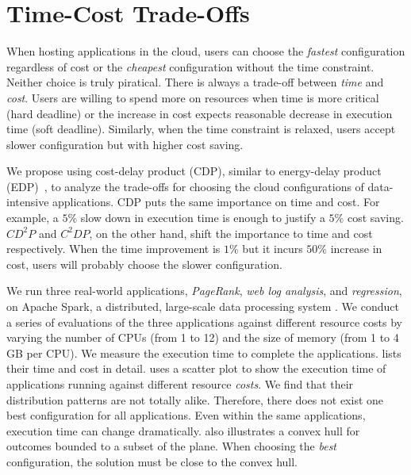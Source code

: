 \section{Time-Cost Trade-Offs}
\label{sec:cdp}



When hosting applications in the cloud,
users can choose the \emph{fastest} configuration regardless of cost
or the \emph{cheapest} configuration without the time constraint.
Neither choice is truly piratical.
There is always a trade-off between \emph{time} and \emph{cost}.
Users are willing to spend more on resources when
time is more critical (hard deadline) or
the increase in cost expects reasonable decrease in execution time (soft deadline).
Similarly, when the time constraint is relaxed, users accept
slower configuration but with higher cost saving.

We propose using cost-delay product (CDP),
similar to energy-delay product (EDP)~\cite{Freeh2007},
to analyze the trade-offs
for choosing the cloud configurations of data-intensive applications.
CDP puts the same importance on time and cost.
For example,
a $5\%$ slow down in execution time
is enough to justify
a $5\%$ cost saving.
$CD^2P$ and $C^2DP$, on the other hand, shift the importance to
time and cost respectively.
When the time improvement is $1\%$ but it incurs $50\%$ increase in cost,
users will probably choose the slower configuration.


We run three real-world applications,
\emph{PageRank},
\emph{web log analysis}, and
\emph{regression},
on Apache Spark, a distributed, large-scale data processing system \cite{spark}.
We conduct a series of evaluations of the three applications against
different resource costs by varying
the number of CPUs (from 1 to 12)
and
the size of memory (from 1 to 4 GB per CPU).
We measure the execution time to complete the applications.
\mytable{\ref{table:raw_data}} lists their time and cost in detail.
\myfigure{\ref{fig:application_performance}} uses a scatter plot
to show 
the execution time of applications running against different resource \emph{costs}.
We find that their distribution patterns are not totally alike.
Therefore, there does not exist one best configuration for all applications.
Even within the same applications, execution time can change dramatically.
\myfigure{\ref{fig:application_performance}} also illustrates a convex hull
for outcomes bounded to a subset of the plane.
When choosing the \emph{best} configuration, the solution must be close to the
convex hull.

